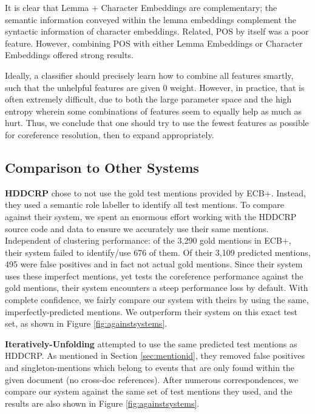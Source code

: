 \documentclass[11pt,a4paper]{article}
\begin{document}
It is clear that Lemma + Character Embeddings are complementary; the semantic information conveyed within the lemma embeddings complement the syntactic information of character embeddings.  Related, POS by itself was a poor feature.  However, combining POS with either Lemma Embeddings or Character Embeddings offered strong results. 

Ideally, a classifier should precisely learn how to combine all features smartly, such that the unhelpful features are given 0 weight.  However, in practice, that is often extremely difficult, due to both the large parameter space and the high entropy wherein some combinations of features seem to equally help as much as hurt.  Thus, we conclude that one should try to use the fewest features as possible for coreference resolution, then to expand appropriately.

\subsection{Comparison to Other Systems}
\textbf{HDDCRP} chose to not use the gold test mentions provided by ECB+.  Instead, they used a semantic role labeller to identify all test mentions.
To compare against their system, we spent an enormous effort working with the HDDCRP source code and data to ensure we accurately use their same mentions.  Independent of clustering performance: of the 3,290 gold mentions in ECB+, their system failed to identify/use 676 of them.  Of their 3,109 predicted mentions, 495 were false positives and in fact not actual gold mentions.  Since their system uses these imperfect mentions, yet tests the coreference performance against the gold mentions, their system encounters a steep performance loss by default.  With complete confidence, we fairly compare our system with theirs by using the same, imperfectly-predicted mentions.  We outperform their system on this exact test set, as shown in Figure \ref{fig:againstsystems}.

\textbf{Iteratively-Unfolding} attempted to use the same predicted test mentions as HDDCRP.  As mentioned in Section \ref{sec:mentionid}, they removed false positives and singleton-mentions which belong to events that are only found within the given document (no cross-doc references).  After numerous correspondences, we compare our system against the same set of test mentions they used, and the results are also shown in Figure \ref{fig:againstsystems}.
\end{document}
